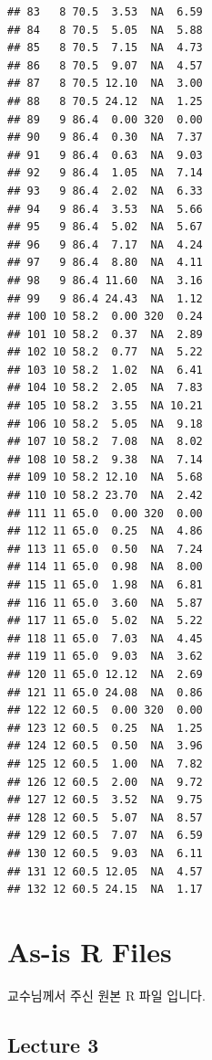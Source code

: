 \documentclass[12pt,]{krantz}
\begin{document}
\begin{verbatim}
## 83   8 70.5  3.53  NA  6.59
## 84   8 70.5  5.05  NA  5.88
## 85   8 70.5  7.15  NA  4.73
## 86   8 70.5  9.07  NA  4.57
## 87   8 70.5 12.10  NA  3.00
## 88   8 70.5 24.12  NA  1.25
## 89   9 86.4  0.00 320  0.00
## 90   9 86.4  0.30  NA  7.37
## 91   9 86.4  0.63  NA  9.03
## 92   9 86.4  1.05  NA  7.14
## 93   9 86.4  2.02  NA  6.33
## 94   9 86.4  3.53  NA  5.66
## 95   9 86.4  5.02  NA  5.67
## 96   9 86.4  7.17  NA  4.24
## 97   9 86.4  8.80  NA  4.11
## 98   9 86.4 11.60  NA  3.16
## 99   9 86.4 24.43  NA  1.12
## 100 10 58.2  0.00 320  0.24
## 101 10 58.2  0.37  NA  2.89
## 102 10 58.2  0.77  NA  5.22
## 103 10 58.2  1.02  NA  6.41
## 104 10 58.2  2.05  NA  7.83
## 105 10 58.2  3.55  NA 10.21
## 106 10 58.2  5.05  NA  9.18
## 107 10 58.2  7.08  NA  8.02
## 108 10 58.2  9.38  NA  7.14
## 109 10 58.2 12.10  NA  5.68
## 110 10 58.2 23.70  NA  2.42
## 111 11 65.0  0.00 320  0.00
## 112 11 65.0  0.25  NA  4.86
## 113 11 65.0  0.50  NA  7.24
## 114 11 65.0  0.98  NA  8.00
## 115 11 65.0  1.98  NA  6.81
## 116 11 65.0  3.60  NA  5.87
## 117 11 65.0  5.02  NA  5.22
## 118 11 65.0  7.03  NA  4.45
## 119 11 65.0  9.03  NA  3.62
## 120 11 65.0 12.12  NA  2.69
## 121 11 65.0 24.08  NA  0.86
## 122 12 60.5  0.00 320  0.00
## 123 12 60.5  0.25  NA  1.25
## 124 12 60.5  0.50  NA  3.96
## 125 12 60.5  1.00  NA  7.82
## 126 12 60.5  2.00  NA  9.72
## 127 12 60.5  3.52  NA  9.75
## 128 12 60.5  5.07  NA  8.57
## 129 12 60.5  7.07  NA  6.59
## 130 12 60.5  9.03  NA  6.11
## 131 12 60.5 12.05  NA  4.57
## 132 12 60.5 24.15  NA  1.17
\end{verbatim}

\cleardoublepage 

\appendix {}


\chapter{As-is R Files}\label{as-is-r-files}

교수님께서 주신 원본 R 파일 입니다.

\section{Lecture 3}\label{lecture-3}
\end{document}
